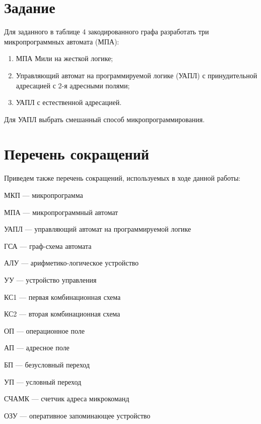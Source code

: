 


	\thispagestyle{empty}
	
	\newpage
	\newpage

	
	\section*{Задание}
	Для заданного в таблице 4 закодированного графа разработать три микропрограммных автомата (МПА):
	\begin{enumerate}
		\item МПА Мили на жесткой логике;
		\item Управляющий автомат на программируемой
		логике (УАПЛ) с принудительной адресацией с 2-я адресными полями;
		\item УАПЛ с естественной адресацией. 
	\end{enumerate}
	Для УАПЛ выбрать смешанный способ микропрограммирования.
	
	

	
\section*{Перечень сокращений}
	Приведем также перечень сокращений, используемых в ходе данной работы:
	
	МКП --- микропрограмма
	
	МПА --- микропрограммный автомат
	
	УАПЛ --- управляющий автомат на программируемой логике
	
	ГСА --- граф-схема автомата
	
	АЛУ --- арифметико-логическое устройство
	
	УУ --- устройство управления
	
	КС1 --- первая комбинационная схема 
	
	КС2 --- вторая комбинационная схема 
	
	ОП --- операционное поле
	
	АП --- адресное поле 
	
	БП --- безусловный переход
	
	УП --- условный переход
	
	
	
	
	
	СЧАМК --- счетчик адреса микрокоманд
	
	ОЗУ  --- оперативное запоминающее устройство
	
